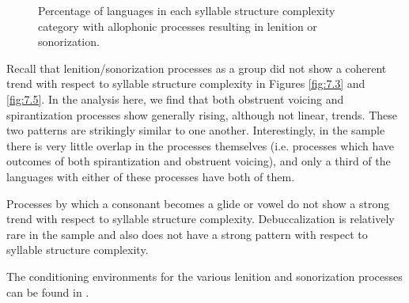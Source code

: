 \begin{figure}
\caption{\label{fig:7.10}Percentage of languages in each syllable structure complexity category with allophonic processes resulting in lenition or sonorization.}
\end{figure}
  Recall that lenition/sonorization processes as a group did not show a coherent trend with respect to syllable structure complexity in Figures \ref{fig:7.3} and \ref{fig:7.5}. In the analysis here, we find that both obstruent voicing and spirantization processes show generally rising, although not linear, trends. These two patterns are strikingly similar to one another. Interestingly, in the sample there is very little overlap in the processes themselves (i.e. processes which have outcomes of both spirantization and obstruent voicing), and only a third of the languages with either of these processes have both of them.

  Processes by which a consonant becomes a glide or vowel do not show a strong trend with respect to syllable structure complexity. Debuccalization is relatively rare in the sample and also does not have a strong pattern with respect to syllable structure complexity.

  The conditioning environments for the various lenition and sonorization processes can be found in .


